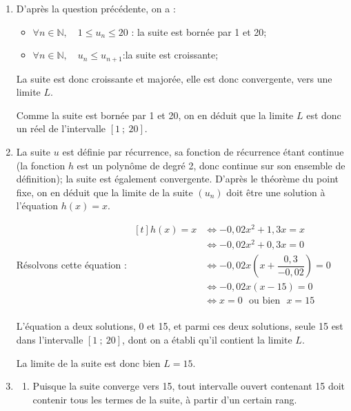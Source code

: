 \documentclass[10pt]{article}
\providecommand{\N}{\mathbb{N}}
\begin{document}
\begin{enumerate}
	\textbf{Conclusion : } On a établi que la propriété était vraie au rang 0, et que, pour tout entier naturel $n$, sa véracité est héréditaire, donc d'après le principe de récurrence, on en déduit :
	\quad
	$\forall n \in \N,\quad 1 \leqslant u_n \leqslant u_{n+1} \leqslant 20.$

	\item D'après la question précédente, on a :

	\begin{itemize}
		\item 	$\forall n \in \N,\quad 1\leqslant u_n \leqslant 20$ : \quad la suite est bornée par 1 et 20;
		\item 	$\forall n \in \N,\quad u_n \leqslant u_{n+1}$:\quad la suite est croissante;
	\end{itemize}
	La suite est donc croissante et majorée, elle est donc convergente, vers une limite $L$.

	Comme la suite est bornée par 1 et 20, on en déduit que la limite $L$ est donc un réel de l'intervalle $[1 ~;~20]$.

	\item La suite $u$ est définie par récurrence, sa fonction de récurrence étant continue (la fonction $h$ est un polynôme de degré 2, donc continue sur son ensemble de définition); la suite est également convergente. D'après le théorème du point fixe, on en déduit que la limite de la suite $(u_n)$ doit être une solution à l'équation $h(x) = x$.

	Résolvons cette équation : \quad
	$\begin{aligned}[t]
		h(x) = x
			&\iff -0,02x^2 +1,3x = x\\
			&\iff -0,02x^2 + 0,3 x = 0\\
			&\iff -0,02x \left(x + \dfrac{0,3}{-0,02}\right ) = 0\\
			&\iff -0,02x (x - 15) = 0\\
			&\iff x = 0 \text{~ ou bien ~} x = 15\\
	\end{aligned}$

	L'équation a deux solutions, 0 et 15, et parmi ces deux solutions, seule 15 est dans l'intervalle $[1 ~;~ 20]$, dont on a établi qu'il contient la limite $L$.

	La limite de la suite est donc bien $L = 15$.

	\item \begin{enumerate}
		\item Puisque la suite converge vers 15, tout intervalle ouvert contenant 15 doit contenir tous les termes de la suite, à partir d'un certain rang.


\end{enumerate}
\end{enumerate}
\end{document}
